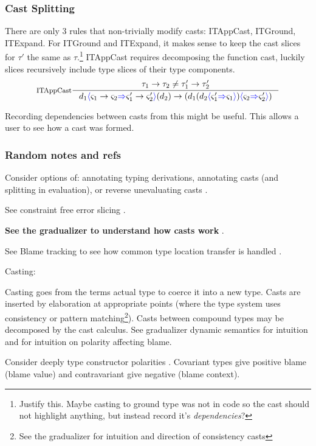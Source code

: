 \subsubsection{Cast Splitting}
There are only 3 rules that non-trivially modify casts: ITAppCast, ITGround, ITExpand. For ITGround and  ITExpand, it makes sense to keep the cast slices for $\tau'$ the same as $\tau$.\footnote{Justify this. Maybe casting to ground type was not in code so the cast should not highlight anything, but instead record it's \textit{dependencies}?} ITAppCast requires decomposing the function cast, luckily slices recursively include type slices of their  type components.
\[\inference[ITAppCast]{\tau_1 \to \tau_2 \neq \tau_1' \to \tau_2'}{d_1\scast{\varsigma_1 \to \varsigma_2}{\varsigma_1' \to \varsigma_2'}(d_2) \to (d_1(d_2\scast{\varsigma_1'}{\varsigma_1})\scast{\varsigma_2}{\varsigma_2'})}\]

\par 

Recording dependencies between casts from this might be useful. This allows a user to see how a cast was formed.


\subsubsection{Random notes and refs}
Consider options of: annotating typing derivations, annotating casts (and splitting in evaluation), or reverse unevaluating casts \cite{FunctionalProgExplain}.\par
See constraint free error slicing \cite{ConstraintFreeErrSlice}.\par
\textbf{See the gradualizer to understand how casts work }\cite{Gradualizer}.\par
See Blame tracking to see how common type location transfer is handled \cite{Blame}.\\ \par
Casting:\par 
Casting goes from the terms actual type to coerce it into a new type. Casts are inserted by elaboration at appropriate points (where the type system uses consistency or pattern matching\footnote{See the gradualizer for intuition and direction of consistency casts}). Casts between compound types may be decomposed by the cast calculus. See gradualizer dynamic semantics \cite{GradualizerDynamic} for intuition and \cite{Blame} for intuition on polarity affecting blame. \par 
Consider deeply type constructor polarities \cite[pg.~473]{TAPL}. Covariant types give positive blame (blame value) and contravariant give negative (blame context).

